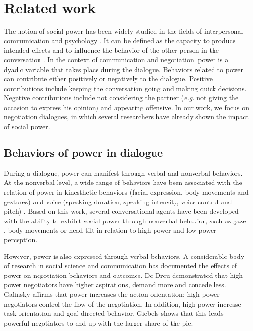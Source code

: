 \documentclass{llncs}
\begin{document}
	\section{Related work}
	The notion of social power has been widely studied in the fields of interpersonal communication and psychology \cite{kecskes2013research}. It can be defined as the capacity to produce intended effects and to influence the behavior of the other person in the conversation \cite{dunbar2005perceptions}. In the context of communication and negotiation, power is a dyadic variable that takes place during the dialogue.
	Behaviors related to power can contribute either positively or negatively to the dialogue. Positive contributions include keeping the conversation going and making quick decisions. Negative contributions include not considering the partner (\emph{e.g.} not giving the occasion to express his opinion) and appearing offensive. In our work, we focus on negotiation dialogues, in which several researchers have already shown the impact of social power\cite{de2004influence,burgoonnonverbal}.
	
	\subsection{Behaviors of power in dialogue}
	\label{sec:domDialogue}
	During a dialogue, power can manifest through verbal and nonverbal behaviors.	
	At the nonverbal level, a wide range of behaviors have been associated with the relation of power in kinesthetic behaviors (facial expression, body movements and gestures) and voice (speaking duration, speaking intensity, voice control and pitch) \cite{burgoonnonverbal}. Based on this work, several conversational agents have been developed with the ability to exhibit social power through nonverbal behavior, such as gaze \cite{lance2008relation}, body movements \cite{mignault2003many} or head tilt \cite{gebhard2014exploring}
	in relation to high-power and low-power perception.
	
	However, power is also expressed through verbal behaviors. A considerable body of research in social science and communication has documented the effects of power on negotiation behaviors and outcomes. De Dreu \cite{de1995impact} demonstrated that high-power negotiators have higher aspirations, demand more and concede less. Galinsky \cite{galinsky2003power} affirms that power increases the action orientation: high-power negotiators control the flow of the negotiation. In addition, high power increase task orientation and goal-directed behavior. Giebels \cite{giebels2000interdependence} shows that this leads powerful negotiators to end up with the larger share of the pie.
	
\end{document}
